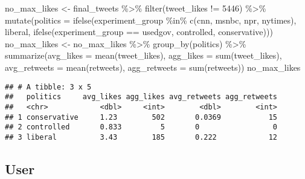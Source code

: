 \documentclass[
]{article}
\newenvironment{Shaded}{\begin{snugshade}}{\end{snugshade}}
\newcommand{\AttributeTok}[1]{\textcolor[rgb]{0.77,0.63,0.00}{#1}}
\newcommand{\DecValTok}[1]{\textcolor[rgb]{0.00,0.00,0.81}{#1}}
\newcommand{\FunctionTok}[1]{\textcolor[rgb]{0.00,0.00,0.00}{#1}}
\newcommand{\NormalTok}[1]{#1}
\newcommand{\OtherTok}[1]{\textcolor[rgb]{0.56,0.35,0.01}{#1}}
\newcommand{\SpecialCharTok}[1]{\textcolor[rgb]{0.00,0.00,0.00}{#1}}
\newcommand{\StringTok}[1]{\textcolor[rgb]{0.31,0.60,0.02}{#1}}
\begin{document}
\begin{Shaded}
\begin{Highlighting}[]
\NormalTok{no\_max\_likes }\OtherTok{\textless{}{-}}\NormalTok{ final\_tweets }\SpecialCharTok{\%\textgreater{}\%} \FunctionTok{filter}\NormalTok{(tweet\_likes }\SpecialCharTok{!=} \DecValTok{5446}\NormalTok{) }\SpecialCharTok{\%\textgreater{}\%} 
  \FunctionTok{mutate}\NormalTok{(}\AttributeTok{politics =} \FunctionTok{ifelse}\NormalTok{(experiment\_group }\SpecialCharTok{\%in\%} \FunctionTok{c}\NormalTok{(}\StringTok{\textquotesingle{}cnn\textquotesingle{}}\NormalTok{, }\StringTok{\textquotesingle{}msnbc\textquotesingle{}}\NormalTok{, }\StringTok{\textquotesingle{}npr\textquotesingle{}}\NormalTok{, }\StringTok{\textquotesingle{}nytimes\textquotesingle{}}\NormalTok{), }\StringTok{\textquotesingle{}liberal\textquotesingle{}}\NormalTok{, }
                           \FunctionTok{ifelse}\NormalTok{(experiment\_group }\SpecialCharTok{==} \StringTok{\textquotesingle{}usedgov\textquotesingle{}}\NormalTok{, }\StringTok{\textquotesingle{}controlled\textquotesingle{}}\NormalTok{, }\StringTok{\textquotesingle{}conservative\textquotesingle{}}\NormalTok{)))}
\NormalTok{no\_max\_likes }\OtherTok{\textless{}{-}}\NormalTok{ no\_max\_likes }\SpecialCharTok{\%\textgreater{}\%} \FunctionTok{group\_by}\NormalTok{(politics) }\SpecialCharTok{\%\textgreater{}\%} 
  \FunctionTok{summarize}\NormalTok{(}\AttributeTok{avg\_likes =} \FunctionTok{mean}\NormalTok{(tweet\_likes), }\AttributeTok{agg\_likes =} \FunctionTok{sum}\NormalTok{(tweet\_likes), }
            \AttributeTok{avg\_retweets =} \FunctionTok{mean}\NormalTok{(retweets), }\AttributeTok{agg\_retweets =} \FunctionTok{sum}\NormalTok{(retweets))}
\NormalTok{no\_max\_likes}
\end{Highlighting}
\end{Shaded}

\begin{verbatim}
## # A tibble: 3 x 5
##   politics     avg_likes agg_likes avg_retweets agg_retweets
##   <chr>            <dbl>     <int>        <dbl>        <int>
## 1 conservative     1.23        502       0.0369           15
## 2 controlled       0.833         5       0                 0
## 3 liberal          3.43        185       0.222            12
\end{verbatim}

\hypertarget{user}{%
\subsection{User}\label{user}}
\end{document}
